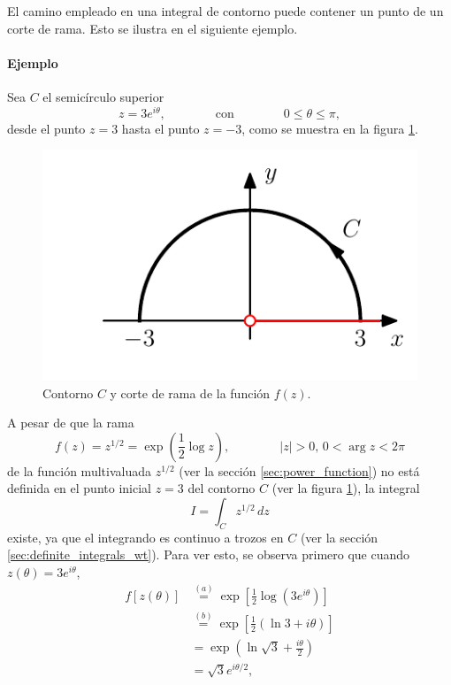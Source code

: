 \documentclass[a4paper]{report}
\begin{document}
El camino empleado en una integral de contorno puede contener un punto de un corte de rama. Esto se ilustra en el siguiente ejemplo.

\paragraph{Ejemplo} Sea \(C\) el semicírculo superior 
\[
 z=3e^{i\theta},
 \qquad\qquad\textrm{con}\qquad\qquad 0\leq\theta\leq\pi,
\]
desde el punto \(z=3\) hasta el punto \(z=-3\), como se muestra en la figura \ref{fig:example_46_01}. 
\begin{figure}[!htb]
  \begin{minipage}[c]{0.35\textwidth}
    \includegraphics[width=\textwidth]{figuras/example_46_01.pdf}
  \end{minipage}\hfill
  \begin{minipage}[c]{0.55\textwidth}
    \caption{
        Contorno \(C\) y corte de rama de la función \(f(z)\).
    }\label{fig:example_46_01}
  \end{minipage}
\end{figure}
A pesar de que la rama
\[
 f(z)=z^{1/2}=\exp\left(\frac{1}{2}\log z\right),
 \qquad\qquad
 |z|>0,\,0<\arg z<2\pi
\]
de la función multivaluada \(z^{1/2}\) (ver la sección \ref{sec:power_function}) no está definida en el punto inicial \(z=3\) del contorno \(C\) (ver la figura \ref{fig:example_46_01}), la integral 
\[
 I=\int_C z^{1/2}\,dz
\]
existe, ya que el integrando es continuo a trozos en \(C\) (ver la sección \ref{sec:definite_integrals_wt}). Para ver esto, se observa primero que cuando \(z(\theta)=3e^{i\theta}\),
\begin{align*}
 f[z(\theta)]&\overset{(a)}{=}\exp\left[\frac{1}{2}\log(3e^{i\theta})\right]\\
  &\overset{(b)}{=}\exp\left[\frac{1}{2}(\ln 3+i\theta)\right]\\
  &=\exp\left(\ln\sqrt{3}+\frac{i\theta}{2}\right)\\
  &=\sqrt{3}e^{i\theta/2},
\end{align*}
\end{document}
